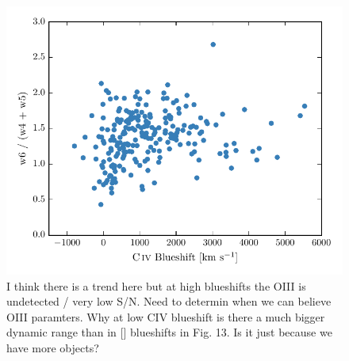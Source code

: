\begin{figure}
    \centering
    \includegraphics[width=\textwidth]{figures/chapter04/civ_blueshift_oiii_blueshift_components.pdf} 
    \caption{I think there is a trend here but at high blueshifts the OIII is undetected / very low S/N. Need to determin when we can believe OIII paramters. Why at low CIV blueshift is there a much bigger dynamic range than in [] blueshifts in Fig. 13. Is it just because we have more objects?}     
    \label{fig:civ_blueshift_oiii_blueshift_components}
\end{figure}

